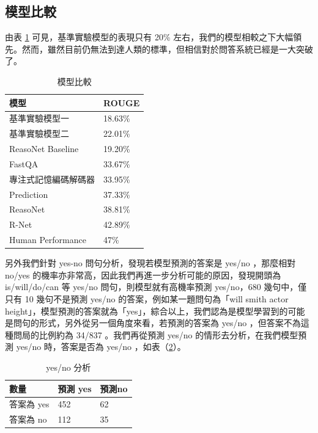 \subsection{模型比較}
由表 \ref{table:model} 可見，基準實驗模型的表現只有 20\% 左右，我們的模型相較之下大幅領先。然而，雖然目前仍無法到達人類的標準，但相信對於問答系統已經是一大突破了。
\begin{table}
    \caption{模型比較}
    \label{table:model}
    \centering
    \begin{tabular}{|l|l|}
        \hline
        模型 & ROUGE\\
        \hline
        基準實驗模型一 & 18.63\% \\
        \hline
        基準實驗模型二 & 22.01\% \\%
        \hline
        ReasoNet Baseline \cite{shen2016reasonet}& 19.20\% \\
        \hline
        FastQA \cite{weissenborn2017making} & 33.67\% \\
        \hline
        專注式記憶編碼解碼器 &  33.95\% \\ %
        \hline
        Prediction \cite{wang2016machine} & 37.33\% \\
        \hline
        ReasoNet \cite{shen2016reasonet} & 38.81\% \\
        \hline
        R-Net & 42.89\% \\
        \hline
        Human Performance &47\% \\ %
        \hline
    \end{tabular}
\end{table}

另外我們針對 yes-no 問句分析，發現若模型預測的答案是 yes/no ，那麼相對 no/yes 的機率亦非常高，因此我們再進一步分析可能的原因，發現開頭為 is/will/do/can 等 yes/no 問句，則模型就有高機率預測 yes/no，680 幾句中，僅只有 10 幾句不是預測 yes/no 的答案，例如某一題問句為「will smith actor height」，模型預測的答案就為「yes」，綜合以上，我們認為是模型學習到的可能是問句的形式，另外從另一個角度來看，若預測的答案為 yes/no ，但答案不為這種問局的比例約為 34/837 。我們再從預測 yes/no 的情形去分析，在我們模型預測 yes/no 時，答案是否為 yes/no ，如表（\ref{table:yes_no}）。

\begin{table}
    \caption{yes/no 分析}
    \label{table:yes_no}
    \centering
    \begin{tabular}{|l|l|l|}
        \hline
        數量 & 預測 yes & 預測no \\
        \hline
        答案為 yes & 452 & 62 \\
        \hline
        答案為 no & 112 & 35 \\
        \hline
    \end{tabular}
\end{table}

